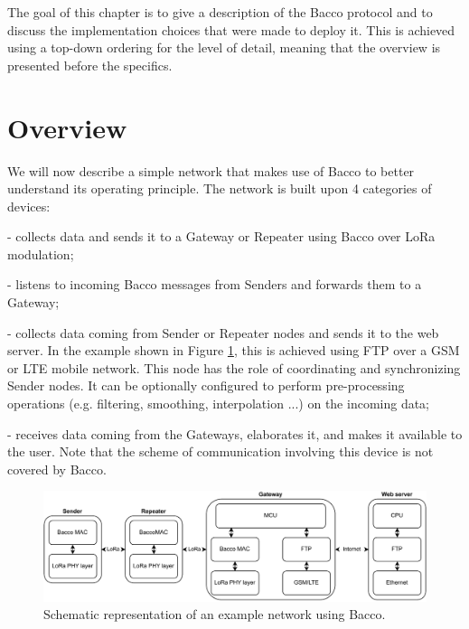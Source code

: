 The goal of this chapter is to give a description of the Bacco protocol and to discuss the
implementation choices that were made to deploy it. This is achieved using a top-down ordering for the level
of detail, meaning that the overview is presented before the specifics.

\section{Overview}
We will now describe a simple network that makes use of Bacco to better understand its operating principle. The
network is built upon 4 categories of devices:

\begin{description}[font=$\bullet$~\normalfont\scshape\color{blue!50!black}]
    \item [Sender node] - collects data and sends it to a Gateway or Repeater using Bacco over LoRa modulation;
    \item [Repeater node] - listens to incoming Bacco messages from Senders and forwards them to a Gateway;
    \item [Gateway node] - collects data coming from Sender or Repeater nodes and sends it to the web server. In the example
        shown in Figure \ref{img: network stack}, this is achieved using \gls{FTP} over a \gls{GSM} or \gls{LTE} mobile
        network. This node has the role of coordinating and synchronizing Sender nodes. It can be optionally configured
        to perform pre-processing operations (e.g. filtering, smoothing, interpolation ...) on the incoming data;
    \item [Web server] - receives data coming from the Gateways, elaborates it, and makes it available to the user. Note
        that the scheme of communication involving this device is not covered by Bacco.
\end{description}

\begin{figure}[ht]
    \centering
    \includegraphics[width=1.0\textwidth]{uml/network_stack.pdf}
    \caption{Schematic representation of an example network using Bacco.}
    \label{img: network stack}
\end{figure}

